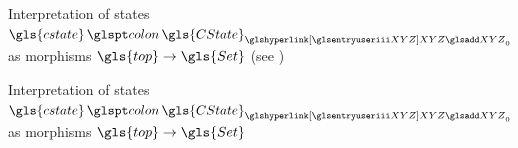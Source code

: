 %
\ifwithagda
  \caption{Interpretation of states $\gls{cstate} \glsop{colon} {\gls{CState}}_{{\Z}_0}$ as morphisms $\gls{top} \to \gls{Set}$ (see )}
\else
\caption{Interpretation of states $\gls{cstate} \glsop{colon} {\gls{CState}}_{{\Z}_0}$ as morphisms $\gls{top} \to \gls{Set}$}
\fi
\label{fig:cstatesem}

